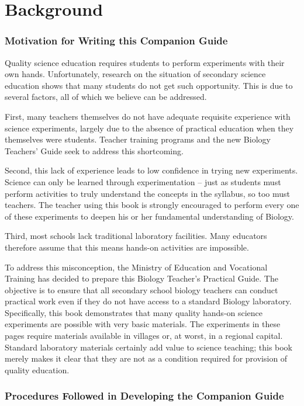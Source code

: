 \chapter*{Background}

\subsection*{Motivation for Writing this Companion Guide}

Quality science education requires students to perform experiments with their own hands. Unfortunately, research on the situation of secondary science education shows that many students do not get such opportunity. This is due to several factors, all of which we believe can be addressed.

First, many teachers themselves do not have adequate requisite  experience with science experiments, largely due to the absence of practical education when they themselves were students. Teacher training programs and the new Biology Teachers' Guide seek to address this shortcoming.

Second, this lack of experience leads to low confidence in trying new experiments. Science can only be learned through experimentation -- just as students must perform activities to truly understand the concepts in the syllabus, so too must teachers. The teacher using this book is strongly encouraged to perform every one of these experiments to deepen his or her fundamental understanding of Biology.

Third, most schools lack traditional laboratory facilities. Many educators therefore assume that this means hands-on activities are impossible.

To address this misconception, the Ministry of Education and Vocational Training has decided to prepare this Biology Teacher's Practical Guide. The objective is to ensure that all secondary school biology teachers can conduct practical work even if they do not have access to a standard Biology laboratory. Specifically, this book demonstrates that many quality hands-on science experiments are possible with very basic materials. The experiments in these pages require materials available in villages or, at worst, in a regional capital. Standard laboratory materials certainly add value to science teaching; this book merely makes it clear that they are not as a condition required for provision of quality education.

\subsection*{Procedures Followed in Developing the Companion Guide}


